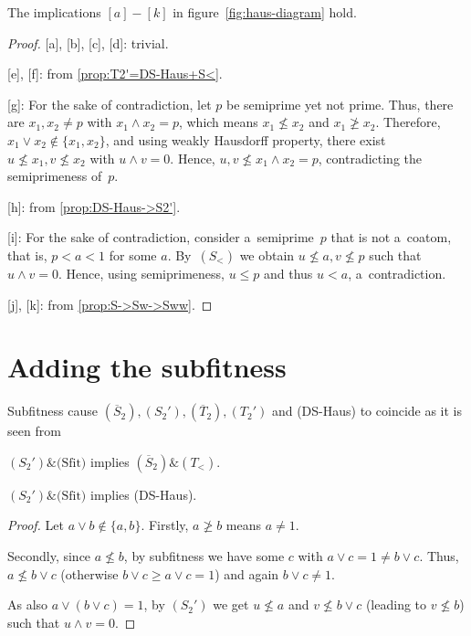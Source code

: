 \begin{prop}
  The implications $[a]-[k]$ in figure~\ref{fig:haus-diagram} hold.
\end{prop}
\begin{proof}

  [a], [b], [c], [d]:
  trivial.

  [e], [f]:
  from \ref{prop:T2'=DS-Haus+S<}.

  [g]:
  For the sake of contradiction, let $p$ be semiprime yet not prime.
  Thus, there are $x_1, x_2 \ne p$ with $x_1 \wedge x_2 = p$, which means
  $x_1\not\le x_2$ and $x_1\not\ge x_2$.
  Therefore, $x_1 \vee x_2 \not\in \{ x_1, x_2 \}$, and using weakly Hausdorff
  property, there exist $u\not\le x_1, v\not\le x_2$ with $u \wedge v = 0$.
  Hence, $u, v\not\le x_1 \wedge x_2 = p$, contradicting the semiprimeness
  of~$p$.

  [h]:
  from \ref{prop:DS-Haus->S2'}.

  [i]:
  For the sake of contradiction, consider a~semiprime~$p$ that is not a~coatom,
  that is, $p < a < 1$ for some $a$.
  By~$(S_<)$ we obtain $u\not\le a, v\not\le p$ such that $u \wedge v = 0$.
  Hence, using semiprimeness, $u \le p$ and thus $u < a$, a~contradiction.

  [j], [k]:
  from \ref{prop:S->Sw->Sww}.
\end{proof}

\section{Adding the subfitness}

Subfitness cause $(\overline{S}_2), (S_2'), (\overline{T}_2), (T_2')$ and
(DS-Haus) to coincide as it is seen from

\begin{thm} \label{thm:what-does-sfit-do}
  $(S_2')\&\text{(Sfit)}$ implies $(\overline{S}_2)\&(T_<)$.
\end{thm}

\begin{lem} \label{lem:S2'+Sfit->DSHaus}
  $(S_2')\&\text{(Sfit)}$ implies (DS-Haus).
\end{lem}
\begin{proof}
  Let $a \vee b\not\in \{ a, b \}$.
  Firstly, $a\not\ge b$ means $a \ne 1$.

  Secondly, since $a\not\le b$, by subfitness we have some $c$ with $a \vee c =
  1 \ne b \vee c$.
  Thus, $a\not\le b \vee c$ (otherwise $b \vee c \ge a \vee c = 1$) and again
  $b \vee c \ne 1$.

  As also $a \vee (b \vee c) = 1$, by $(S_2')$ we get $u\not\le a$ and
  $v\not\le b \vee c$ (leading to $v\not\le b$) such that $u \wedge v = 0$.
\end{proof}

